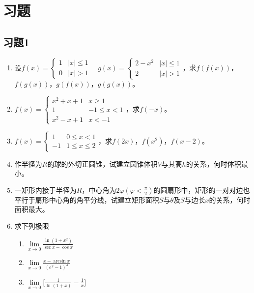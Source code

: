 \chapter{习题} 
\section{习题1} %
\label{sec:习题}
\begin{enumerate}
    \item 设$f(x)=\begin{cases}
                    1&\left|x\right| \leq 1\\
                    0 & \left|x\right| >1 
                  \end{cases} \quad 
             g(x)=\begin{cases}
                    2-x^2 & \left|x\right| \leq 1 \\ 
                    2 & \left|x\right| >1 
                  \end{cases} $，求$f(f(x))$，$f(g(x))$，$g(f(x))$，$g(g(x))$。
    \item $f(x)=\begin{cases}
                    x^2+x+1 & x\geq 1\\
                    1 & -1\leq x <1 \\
                    x^2-x+1 & x<-1
                \end{cases}$，求$f(-x)$。
    \item $f(x)=\begin{cases}
                    1 & 0\leq x<1\\
                    -1 & 1\leq x \leq 2
                \end{cases}$，求$f(2x)$，$f(x^2)$，$f(x-2)$。
    \item 作半径为$R$的球的外切正圆锥，试建立圆锥体积$V$与其高$h$的关系，何时体积最小。
    \item 一矩形内接于半径为$R$，中心角为$2\varphi(\varphi<\frac{\pi}{2})$的圆扇形中，矩形的一对对边也平行于扇形中心角的角平分线，试建立矩形面积$S$与$\theta$及$S$与边长$x$的关系，何时面积最大。
    \item 求下列极限
        \begin{enumerate}[(1)]
            \item $\lim\limits_{x \to 0}\frac{\ln(1+x^2)}{\sec x - \cos x }$
            \item $\lim\limits_{x \to 0} \frac{x - \arcsin x}{(e^x -1)^3}$
            \item $\lim\limits_{x \to 0} \big[\frac{1}{\ln(1+x)}-\frac{1}{x}\big]$

\end{enumerate}
\end{enumerate}
